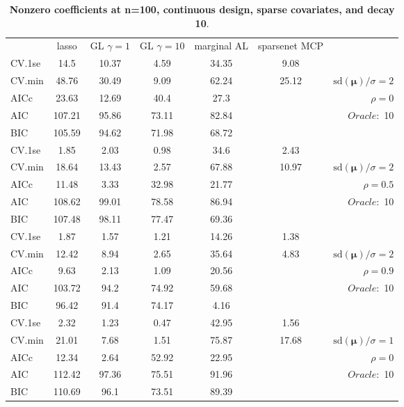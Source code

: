 \begin{table}\vspace{-.5cm}
\caption[l]{ { \bf Nonzero coefficients at n=100, continuous design, 
sparse covariates, and  decay  10}.}
\vspace{-.5cm}
\footnotesize{}
\begin{center}
\begin{tabular}{l*{5}{c}|r}
& lasso & GL $\gamma=1$ & GL $\gamma=10$ & marginal AL & sparsenet MCP  & \\
 \cline{1-7}
CV.1se & 14.5 & 10.37 & 4.59 & 34.35 & 9.08 & \\
CV.min & 48.76 & 30.49 & 9.09 & 62.24 & 25.12 &  $\mathrm{sd}(\mathbf{\mu})/\sigma=2$ \\
AICc & 23.63 & 12.69 & 40.4 & 27.3 & & $\rho=0$ \\
AIC & 107.21 & 95.86 & 73.11 & 82.84 & &  \multirow{2}{*}{$Oracle: $ 10} \\
BIC & 105.59 & 94.62 & 71.98 & 68.72 & &  \\
 \hline 
CV.1se & 1.85 & 2.03 & 0.98 & 34.6 & 2.43 & \\
CV.min & 18.64 & 13.43 & 2.57 & 67.88 & 10.97 &  $\mathrm{sd}(\mathbf{\mu})/\sigma=2$ \\
AICc & 11.48 & 3.33 & 32.98 & 21.77 & & $\rho=0.5$ \\
AIC & 108.62 & 99.01 & 78.58 & 86.94 & &  \multirow{2}{*}{$Oracle: $ 10} \\
BIC & 107.48 & 98.11 & 77.47 & 69.36 & &  \\
 \hline 
CV.1se & 1.87 & 1.57 & 1.21 & 14.26 & 1.38 & \\
CV.min & 12.42 & 8.94 & 2.65 & 35.64 & 4.83 &  $\mathrm{sd}(\mathbf{\mu})/\sigma=2$ \\
AICc & 9.63 & 2.13 & 1.09 & 20.56 & & $\rho=0.9$ \\
AIC & 103.72 & 94.2 & 74.92 & 59.68 & &  \multirow{2}{*}{$Oracle: $ 10} \\
BIC & 96.42 & 91.4 & 74.17 & 4.16 & &  \\
 \hline 
CV.1se & 2.32 & 1.23 & 0.47 & 42.95 & 1.56 & \\
CV.min & 21.01 & 7.68 & 1.51 & 75.87 & 17.68 &  $\mathrm{sd}(\mathbf{\mu})/\sigma=1$ \\
AICc & 12.34 & 2.64 & 52.92 & 22.95 & & $\rho=0$ \\
AIC & 112.42 & 97.36 & 75.51 & 91.96 & &  \multirow{2}{*}{$Oracle: $ 10} \\
BIC & 110.69 & 96.1 & 73.51 & 89.39 & &  \\

\end{tabular}
\end{center}
\end{table}
